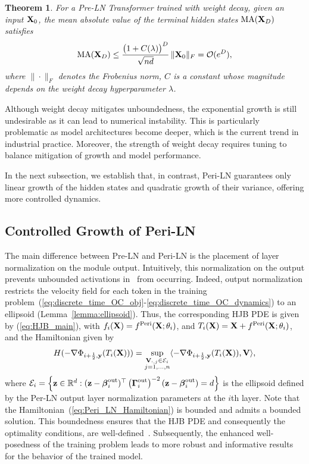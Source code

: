 \documentclass[journal]{IEEEtran}
\def\eqref#1{equation~\ref{#1}}
\newcommand{\bfV}{{\bf V}}
\newcommand{\bfX}{{\bf X}}
\newcommand{\bfy}{ {\bf y}}
\newcommand{\bfGamma}{{\boldsymbol \Gamma}}
\newcommand{\bfbeta}{{\boldsymbol \beta}}
\renewcommand{\eqref}[1]{(\ref{#1})}
\theoremstyle{plain}
\newtheorem{theorem}{Theorem}
\theoremstyle{definition}
\theoremstyle{remark}
\begin{document}
\begin{theorem}\label{thm:PreLN_expo_growth}
    For a Pre-LN Transformer trained with weight decay, given an input $\bfX_0$, the mean absolute value of the terminal hidden states ${\rm MA}(\bfX_D)$ satisfies
\begin{align}\label{eq:expo_growth_discrete}
        {\rm MA}(\bfX_D) \leq  \frac{\bigl(1 + C(\lambda)\bigr)^D}{\sqrt{nd}} \, \|\bfX_0\|_F = \mathcal{O}(e^D),
    \end{align}
    where $\| \cdot \|_F$ denotes the Frobenius norm, $C$ is a constant whose magnitude depends on the weight decay hyperparameter $\lambda$.
\end{theorem}
Although weight decay mitigates unboundedness, the exponential growth is still undesirable as it can lead to numerical instability. This is particularly problematic as model architectures become deeper, which is the current trend in industrial practice. Moreover, the strength of weight decay requires tuning to balance mitigation of growth and model performance.

In the next subsection, we establish that, in contrast, Peri-LN guarantees only linear growth of the hidden states and quadratic growth of their variance, offering more controlled dynamics.

\subsection{Controlled Growth of Peri-LN} 
The main difference between Pre-LN and Peri-LN is the placement of layer normalization on the module output. Intuitively, this normalization on the output prevents unbounded activations in~ from occurring. Indeed, output normalization restricts the velocity field for each token in the training problem~(\ref{eq:discrete_time_OC_obj}-\ref{eq:discrete_time_OC_dynamics}) to an ellipsoid (Lemma~\ref{lemma:ellipsoid}). Thus, the corresponding HJB PDE is given by \eqref{eq:HJB_main}, with $f_i(\bfX) = f^{\rm Peri}(\bfX; \theta_i)$, and $T_i(\bfX) = \bfX + f^{\rm Peri}(\bfX; \theta_i)$, and the Hamiltonian given by
\begin{equation}\label{eq:Peri_LN_Hamiltonian}
    H(-\nabla \Phi_{i+\frac{1}{2}, \bfy}(T_i(\bfX))) = \sup_{\substack{\bfV_{:, j} \in \mathcal{E}_i \\ j=1,...,n}} \langle -\nabla \Phi_{i+\frac{1}{2}, \bfy}(T_i(\bfX)), \bfV \rangle,
\end{equation}
where $\mathcal{E}_i  = \left\{ \mathbf{z} \in \mathbb{R}^d : (\mathbf{z} - \bfbeta_i^{\rm out})^\top \left(\bfGamma_i^{\rm out} \right)^{-2} (\mathbf{z} - \bfbeta_i^{\rm out}) = d \right\}$ is the ellipsoid defined by the Per-LN output layer normalization parameters at the $i$th layer. Note that the Hamiltonian~\eqref{eq:Peri_LN_Hamiltonian} is bounded and admits a bounded solution. This boundedness ensures that the HJB PDE and consequently the optimality conditions, are well-defined~\cite{zhang2023mean}. Subsequently, the enhanced well-posedness of the training problem leads to more robust and informative results for the behavior of the trained model.
\end{document}
